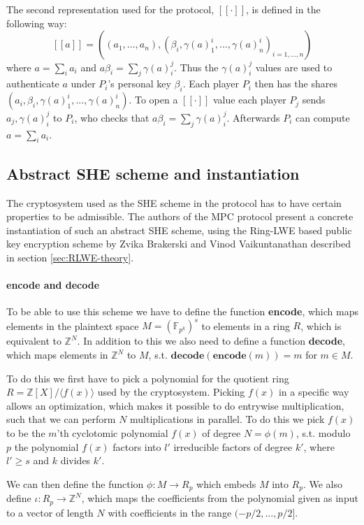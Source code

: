 \documentclass[../main.tex]{subfiles}
\begin{document}
The second representation used for the protocol, $[\![ \cdot ]\!]$, is defined in the following way:
$$[\![ a ]\!] = ((a_1, ..., a_n), (\beta_i, \gamma(a)^i_1, ..., \gamma(a)^i_n)_{i = 1, ..., n})$$
where $a = \sum_i a_i$ and $a\beta_i = \sum_j \gamma(a)^j_i$. Thus the $\gamma(a)^j_i$ values are used to authenticate $a$ under $P_i$'s personal key $\beta_i$. Each player $P_i$ then has the shares $(a_i, \beta_i, \gamma(a)^i_1, ..., \gamma(a)^i_n)$. To open a $[\![ \cdot ]\!]$ value each player $P_j$ sends $a_j, \gamma(a)^j_i$ to $P_i$, who checks that $a\beta_i = \sum_j \gamma(a)^j_i$. Afterwards $P_i$ can compute $a = \sum_i a_i$.

\subsection{Abstract SHE scheme and instantiation}
The cryptosystem used as the SHE scheme in the protocol has to have certain properties to be admissible. The authors of the MPC protocol present a concrete instantiation of such an abstract SHE scheme, using the Ring-LWE based public key encryption scheme by Zvika Brakerski and Vinod Vaikuntanathan \cite{brakerski2011fully} described in section \ref{sec:RLWE-theory}.

\paragraph{encode and decode}
To be able to use this scheme we have to define the function \textbf{encode}, which maps elements in the plaintext space $M = (\mathbb{F}_{p^k})^s$ to elements in a ring $R$, which is equivalent to $\mathbb{Z}^N$. In addition to this we also need to define a function \textbf{decode}, which maps elements in $\mathbb{Z}^N$ to $M$, s.t. $\textbf{decode}(\textbf{encode}(m)) = m$ for $m \in M$.

To do this we first have to pick a polynomial for the quotient ring $R = \mathbb{Z}[X]/\langle f(x) \rangle$ used by the cryptosystem. Picking $f(x)$ in a specific way allows an optimization, which makes it possible to do entrywise multiplication, such that we can perform $N$ multiplications in parallel.
To do this we pick $f(x)$ to be the $m$'th cyclotomic polynomial $f(x)$ of degree $N = \phi(m)$, s.t. modulo $p$ the polynomial $f(x)$ factors into $l'$ irreducible factors of degree $k'$, where $l' \geq s$ and $k$ divides $k'$.

We can then define the function $\phi: M \rightarrow R_p$ which embeds $M$ into $R_p$. We also define $\iota : R_p \rightarrow \mathbb{Z}^N$, which maps the coefficients from the polynomial given as input to a vector of length $N$ with coefficients in the range $(-p/2, ..., p/2]$.
\end{document}
